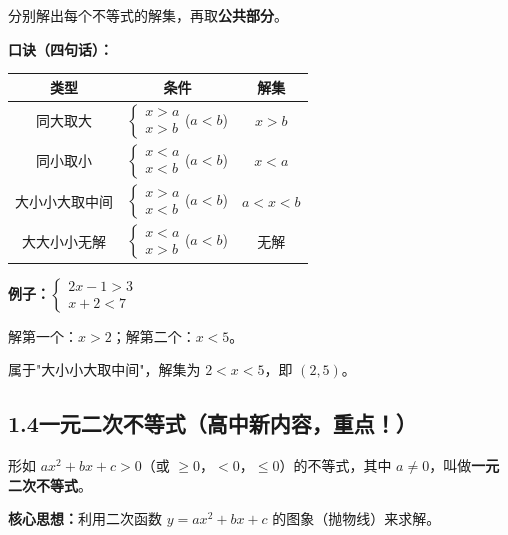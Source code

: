 \documentclass[12pt, a4paper]{ctexart}
\begin{document}
\begin{knowledgebox}[一元一次不等式组的解法]
分别解出每个不等式的解集，再取\textbf{公共部分}。

\medskip
\textbf{口诀（四句话）：}

\begin{center}
\begin{tabular}{|c|c|c|}
\hline
\textbf{类型} & \textbf{条件} & \textbf{解集} \\
\hline
同大取大 & $\begin{cases} x > a \\ x > b \end{cases}$\quad ($a < b$) & $x > b$ \\
\hline
同小取小 & $\begin{cases} x < a \\ x < b \end{cases}$\quad ($a < b$) & $x < a$ \\
\hline
大小小大取中间 & $\begin{cases} x > a \\ x < b \end{cases}$\quad ($a < b$) & $a < x < b$ \\
\hline
大大小小无解 & $\begin{cases} x < a \\ x > b \end{cases}$\quad ($a < b$) & 无解 \\
\hline
\end{tabular}
\end{center}

\textbf{例子：}$\begin{cases} 2x - 1 > 3 \\ x + 2 < 7 \end{cases}$

解第一个：$x > 2$；解第二个：$x < 5$。

属于"大小小大取中间"，解集为 $2 < x < 5$，即 $(2, 5)$。
\end{knowledgebox}

\subsection*{1.4\quad 一元二次不等式（高中新内容，重点！）}

\begin{knowledgebox}[一元二次不等式的定义]
形如 $ax^2 + bx + c > 0$（或 $\geq 0$，$< 0$，$\leq 0$）的不等式，其中 $a \neq 0$，叫做\textbf{一元二次不等式}。

\medskip
\textbf{核心思想：}利用二次函数 $y = ax^2 + bx + c$ 的图象（抛物线）来求解。
\end{knowledgebox}
\end{document}
